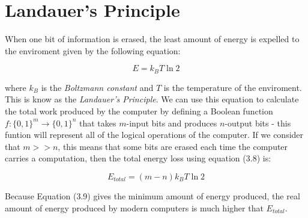 \section{Landauer's Principle}

When one bit of information is erased, the least amount of energy is expelled to the enviroment given by the
following equation:

\begin{equation}
    E = k_BT\ln2
\end{equation}

where $k_B$ is the \textit{Boltzmann constant} and $T$ is the temperature of the enviroment. This is
know as the \textit{Landauer's Principle}\cite{Landauer1961}. We can use this equation to calculate the total work produced
by the computer by defining a Boolean function $f:\{0,1\}^m\to\{0,1\}^n$ that takes $m$-input bits and
produces $n$-output bits - this funtion will represent all of the logical operations of the computer.
If we consider that $m>>n$, this means that some bits are erased each time the computer carries a computation\cite{Marmorkos2024},
then the total energy loss using equation (3.8) is:

\begin{equation}
    E_{total}=(m-n)k_BT\ln2
\end{equation}

Because Equation (3.9) gives the minimum amount of energy produced, the real amount of energy produced by
modern computers is much higher that $E_{total}$.